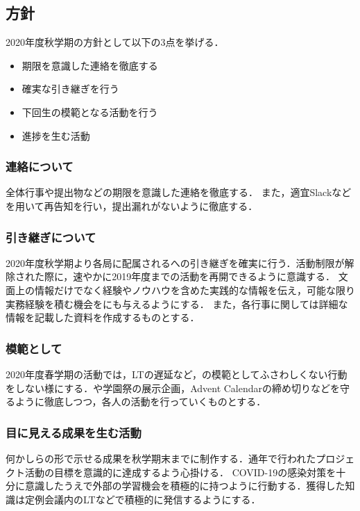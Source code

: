 \subsection*{\newGradeIfKouki{}\secondGrade{}方針}


2020年度秋学期の\secondGrade{}方針として以下の3点を挙げる．

\begin{itemize}
    \item 期限を意識した連絡を徹底する
    \item 確実な引き継ぎを行う
    \item 下回生の模範となる活動を行う
    \item 進捗を生む活動
\end{itemize}

\subsubsection*{連絡について}
全体行事や提出物などの期限を意識した連絡を徹底する．
また，適宜Slackなどを用いて再告知を行い，提出漏れがないように徹底する．

\subsubsection*{引き継ぎについて}
2020年度秋学期より各局に配属される\firstGrade{}への引き継ぎを確実に行う．活動制限が解除された際に，速やかに2019年度までの活動を再開できるように意識する．
文面上の情報だけでなく経験やノウハウを含めた実践的な情報を伝え，可能な限り実務経験を積む機会を\firstGrade{}にも与えるようにする．
また，各行事に関しては詳細な情報を記載した資料を作成するものとする．

\subsubsection*{模範として}
2020年度春学期の活動では，LTの遅延など，\firstGrade{}の模範としてふさわしくない行動をしない様にする．や学園祭の展示企画，Advent Calendarの締め切りなどを守るように徹底しつつ，各人の活動を行っていくものとする．

\subsubsection*{目に見える成果を生む活動}
何かしらの形で示せる成果を秋学期末までに制作する．通年で行われたプロジェクト活動の目標を意識的に達成するよう心掛ける．
COVID-19の感染対策を十分に意識したうえで外部の学習機会を積極的に持つように行動する．獲得した知識は定例会議内のLTなどで積極的に発信するようにする．
